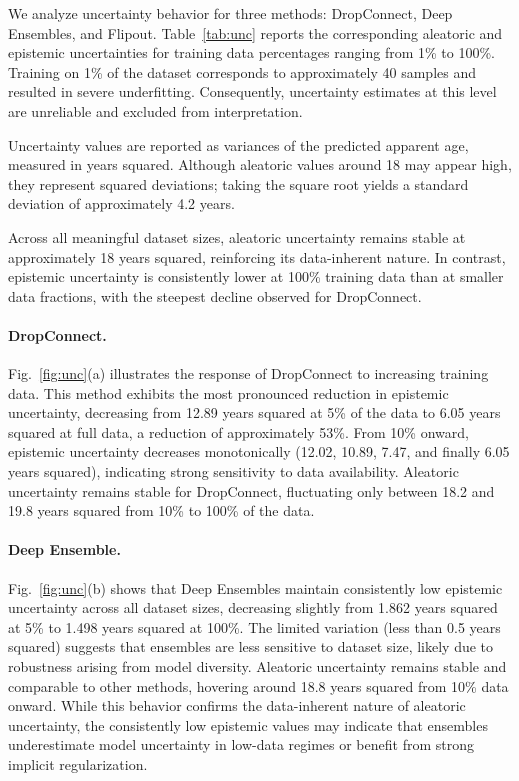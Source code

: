 \documentclass[runningheads]{llncs}
\begin{document}
We analyze uncertainty behavior for three methods: DropConnect, Deep Ensembles, and Flipout. Table~\ref{tab:unc} reports the corresponding aleatoric and epistemic uncertainties for training data percentages ranging from 1\% to 100\%. Training on 1\% of the dataset corresponds to approximately 40 samples and resulted in severe underfitting. Consequently, uncertainty estimates at this level are unreliable and excluded from interpretation.

Uncertainty values are reported as variances of the predicted apparent age, measured in years squared. Although aleatoric values around 18 may appear high, they represent squared deviations; taking the square root yields a standard deviation of approximately 4.2 years.

Across all meaningful dataset sizes, aleatoric uncertainty remains stable at approximately 18 years squared, reinforcing its data-inherent nature. In contrast, epistemic uncertainty is consistently lower at 100\% training data than at smaller data fractions, with the steepest decline observed for DropConnect.

\paragraph{DropConnect.}
Fig.~\ref{fig:unc}(a) illustrates the response of DropConnect to increasing training data. This method exhibits the most pronounced reduction in epistemic uncertainty, decreasing from 12.89 years squared at 5\% of the data to 6.05 years squared at full data, a reduction of approximately 53\%. From 10\% onward, epistemic uncertainty decreases monotonically (12.02, 10.89, 7.47, and finally 6.05 years squared), indicating strong sensitivity to data availability. Aleatoric uncertainty remains stable for DropConnect, fluctuating only between 18.2 and 19.8 years squared from 10\% to 100\% of the data.

\paragraph{Deep Ensemble.}
Fig.~\ref{fig:unc}(b) shows that Deep Ensembles maintain consistently low epistemic uncertainty across all dataset sizes, decreasing slightly from 1.862 years squared at 5\% to 1.498 years squared at 100\%. The limited variation (less than 0.5 years squared) suggests that ensembles are less sensitive to dataset size, likely due to robustness arising from model diversity. Aleatoric uncertainty remains stable and comparable to other methods, hovering around 18.8 years squared from 10\% data onward. While this behavior confirms the data-inherent nature of aleatoric uncertainty, the consistently low epistemic values may indicate that ensembles underestimate model uncertainty in low-data regimes or benefit from strong implicit regularization.
\end{document}

